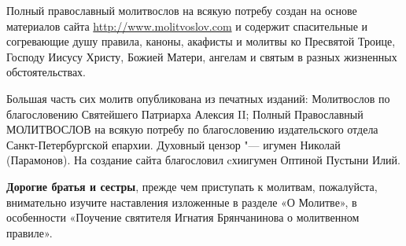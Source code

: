 \vspace*{0.2\paperheight}

\renewcommand\myid{announce}

\begin{identity}

Полный православный молитвослов на всякую потребу создан на основе материалов сайта \url{http://www.molitvoslov.com} и содержит спасительные и согревающие душу правила, каноны, акафисты и молитвы ко Пресвятой Троице, Господу Иисусу Христу, Божией Матери, ангелам и святым в разных жизненных обстоятельствах.

Большая часть сих молитв опубликована из печатных изданий: Молитвослов по благословению Святейшего Патриарха Алексия II; Полный Православный МОЛИТВОСЛОВ на всякую потребу по благословению издательского отдела Санкт-Петербургской епархии. Духовный цензор "--- игумен Николай (Парамонов). На создание сайта благословил cхиигумен Оптиной Пустыни Илий.

\textbf{Дорогие братья и сестры}, прежде чем приступать к молитвам, пожалуйста, внимательно изучите наставления изложенные в разделе «О Молитве», в особенности «Поучение святителя Игнатия Брянчанинова о молитвенном правиле».

\end{identity}

